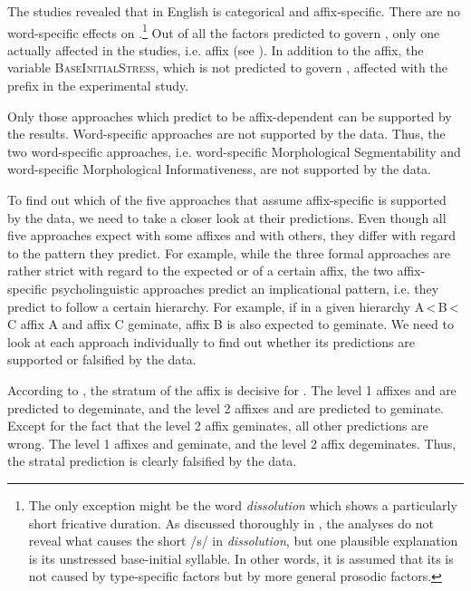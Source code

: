 The studies revealed that  in English is categorical and affix-specific. There are no word-specific effects on .\footnote{The only exception might be the word \textit{dissolution} which shows a particularly short fricative duration. As discussed thoroughly in , the analyses do not reveal what causes the short /s/ in \textit{dissolution}, but one plausible explanation is its unstressed base-initial syllable. In other words, it is assumed that its  is not caused by type-specific factors but by more general prosodic factors.} Out of all the factors predicted to govern , only one actually affected  in the studies, i.e. affix (see ). 
In addition to the affix, the variable \textsc{BaseInitialStress}, which is not predicted to govern ,  affected  with the prefix  in the experimental study. 

Only those approaches which predict  to be affix-dependent can be supported by the results. Word-specific approaches are not supported by the data.
Thus, the two word-specific approaches, i.e. word-specific Morphological Segmentability and word-specific Morphological Informativeness, are  not supported by the data. 

To find out which of the five approaches that assume affix-specific  is supported by the data, we need to take a closer look at their predictions. Even though all five approaches expect   with some affixes and  with others, they differ with regard to the  pattern they predict. For example, while the three formal approaches are rather strict with regard to the expected  or  of a  certain affix, the two affix-specific psycholinguistic approaches predict an implicational  pattern, i.e. they predict  to follow a certain hierarchy. For example, if in a given hierarchy A\,<\,B\,<\,C  affix A and affix C geminate, affix B is also expected to geminate. 
We need to look at each approach individually to find out whether its predictions are supported or falsified by the data. 

According to , the stratum of the affix is decisive for . The level 1 affixes  and  are predicted to degeminate, and the level 2 affixes  and  are predicted to geminate. Except for the fact that the level 2 affix  geminates, all other predictions are wrong. The level 1 affixes  and  geminate, and the level 2 affix  degeminates. Thus, the stratal prediction is clearly falsified by the data.

